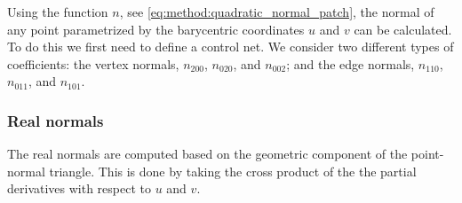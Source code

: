 
	Using the function $n$, see \eqref{eq:method:quadratic_normal_patch}, the normal of any point parametrized by the barycentric coordinates $u$ and $v$ can be calculated. To do this we first need to define a control net. We consider two different types of coefficients: the vertex normals, $n_{200}$, $n_{020}$, and $n_{002}$; and the edge normals, $n_{110}$, $n_{011}$, and $n_{101}$. 

\subsubsection{Real normals}
\label{sss:method:normals:realNormals}
		The real normals are computed based on the geometric component of the point-normal triangle. This is done by taking the cross product of the the partial derivatives with respect to $u$ and $v$. 


